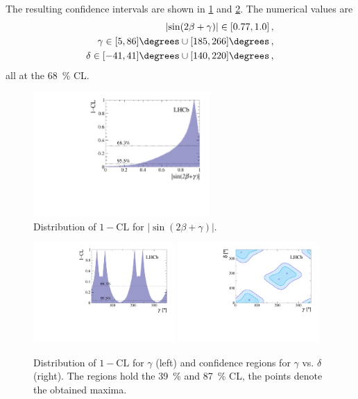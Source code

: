 The resulting confidence intervals are shown in \cref{fig:sin2betaplusGamma} and \ref{fig:GammaAndGammavsdelta}.
The numerical values are
\begin{align*}
\left|\sin\!\left(2\beta+\gamma\right)\right|\in[0.77, 1.0]\,,\\
\gamma\in[5, 86]\degrees\cup[185, 266]\degrees\,,\\
\delta\in[-41, 41]\degrees\cup[140, 220]\degrees\,,\\
\end{align*}
all at the \SI{68}{\percent} CL.
\begin{figure}[tbp]
    \centering
    \includegraphics[width=0.6\textwidth]{11Result/figs/Sin2BetaPGamma.pdf}
    \caption{Distribution of $1-\text{CL}$ for $\left|\sin\!\left(2\beta+\gamma\right)\right|$.}
    \label{fig:sin2betaplusGamma}
\end{figure}
\begin{figure}[tbp]
    \centering
    \includegraphics[width=0.48\textwidth]{11Result/figs/Gamma.pdf}
    \includegraphics[width=0.48\textwidth]{11Result/figs/GammavsDelta.pdf}
    \caption{Distribution of $1-\text{CL}$ for $\gamma$ (left) and confidence regions for $\gamma$ vs. $\delta$ (right).
    The regions hold the \SI{39}{\percent} and \SI{87}{\percent} CL, the points denote the obtained maxima.}
    \label{fig:GammaAndGammavsdelta}
\end{figure}
